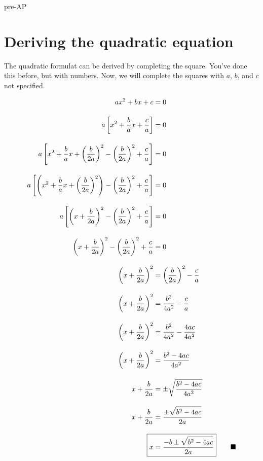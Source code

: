 \begin{taggedblock}{pre-AP}

\section*{Deriving the quadratic equation}

The quadratic formulat can be derived by completing the square.
You've done this before, but with numbers.
Now, we will complete the squares with $a$, $b$, and $c$ not specified.

{\Large
\begin{align}
    a x^2 + bx + c &= 0 
    \\[1em]
    a \left[ 
        x^2 + \frac{b}{a}x + \frac{c}{a} 
    \right] &= 0 
    \\[1em]
    a \left[ 
        x^2 + \frac{b}{a}x    
        + \left( \frac{b}{2a} \right)^2 
        - \left( \frac{b}{2a} \right)^2 
        +     \frac{c}{a} 
    \right] &= 0 
    \\[1em]
    a \left[ 
        \left(
            x^2 
            + \frac{b}{a}x    
            + \left( \frac{b}{2a} \right)^2 
        \right)
        - \left( \frac{b}{2a} \right)^2 
        +     \frac{c}{a} 
    \right] &= 0 
    \\[1em]
    a \left[ 
        \left(
            x + \frac{b}{2a}
        \right)^2
        - \left( \frac{b}{2a} \right)^2 
        +     \frac{c}{a} 
    \right] &= 0 
    \\[1em]
    \left(
        x + \frac{b}{2a}
    \right)^2
    - \left( \frac{b}{2a} \right)^2 
    +     \frac{c}{a} 
    &= 0 
    \\[1em]
    \left(
        x + \frac{b}{2a}
    \right)^2
    &=
     \left( \frac{b}{2a} \right)^2 
         - \frac{c}{a} 
         \\[1em]
    \left(
        x + \frac{b}{2a}
    \right)^2
    &=
     \frac{b^2}{4a^2} - \frac{c}{a} 
     \\[1em]
    \left(
        x + \frac{b}{2a}
    \right)^2
    &=
     \frac{b^2}{4a^2} - \frac{4ac}{4a^2} 
     \\[1em]
    \left(
        x + \frac{b}{2a}
    \right)^2
    &=
     \frac{b^2-4ac}{4a^2} 
     \\[1em]
    x + \frac{b}{2a}
    &=
    \pm \sqrt{   \frac{b^2-4ac}{4a^2}   }
    \\[1em]
    x + \frac{b}{2a}
    &=
    \frac{\pm\sqrt{ \rule{0pt}{2.3ex} b^2-4ac}}{2a}
    \\[1em]
    \Aboxed{
        x &= \frac{-b\pm\sqrt{ \rule{0pt}{2.3ex} b^2-4ac}}{2a}
    }\qquad\blacksquare
\end{align}
}

\end{taggedblock}
